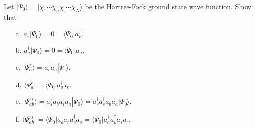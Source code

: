 \documentclass[a4paper]{book}
\newcounter{exercise}[chapter]
\begin{document}
	\begin{exercise}
	Let $|\Psi_0\rangle = | \chi_1 \cdots \chi_a \chi_b \cdots \chi_N \rangle$ be the Hartree-Fock ground state wave function. Show that
	\begin{enumerate}
	
	\item[a.] $a_r | \Psi_0 \rangle = 0 = \langle \Psi_0 | a^\dagger_r$.
	
	\item[b.] $a^\dagger_a | \Psi_0 \rangle = 0 = \langle \Psi_0 | a_a$.
	
	\item[c.] $| \Psi^r_a \rangle = a^\dagger_r a_a | \Psi_0 \rangle $.
	
	\item[d.] $\langle \Psi^r_a | = \langle \Psi_0 | a^\dagger_a a_r$.
	
	\item[e.] $| \Psi^{rs}_{ab} \rangle = a^\dagger_s a_b a^\dagger_r a_a | \Psi_0 \rangle = a^\dagger_r a^\dagger_s a_b  a_a | \Psi_0 \rangle $.
	
	\item[f.] $\langle \Psi^{rs}_{ab} | = \langle \Psi_0 | a^\dagger_a a_r a^\dagger_b a_s = \langle \Psi_0 | a^\dagger_a a^\dagger_b a_s a_r$.
	
	\end{enumerate}
	\end{exercise}
	
\end{document}
